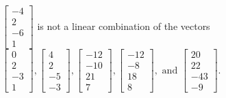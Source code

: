 \begin{exercise}
\begin{exerciseStatement}
  \end{exerciseStatement}
  \begin{exerciseAnswer}
   \(\left[\begin{array}{c}
-4 \\
2 \\
-6 \\
1
\end{array}\right]\) 
  	 is not  
	a linear combination of the vectors \(\left[\begin{array}{c}
0 \\
2 \\
-3 \\
1
\end{array}\right] , \left[\begin{array}{c}
4 \\
2 \\
-5 \\
-3
\end{array}\right] , \left[\begin{array}{c}
-12 \\
-10 \\
21 \\
7
\end{array}\right] , \left[\begin{array}{c}
-12 \\
-8 \\
18 \\
8
\end{array}\right] , \text{ and } \left[\begin{array}{c}
20 \\
22 \\
-43 \\
-9
\end{array}\right]\).

	
  


  \end{exerciseAnswer}
\end{exercise}